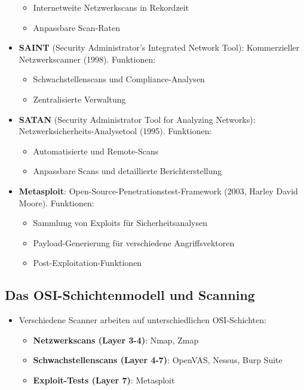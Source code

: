\begin{itemize}
\begin{itemize}
        \item Internetweite Netzwerkscans in Rekordzeit
        \item Anpassbare Scan-Raten
    \end{itemize}
    \item \textbf{SAINT} (Security Administrator's Integrated Network Tool): Kommerzieller Netzwerkscanner (1998). Funktionen:
    \begin{itemize}
        \item Schwachstellenscans und Compliance-Analysen
        \item Zentralisierte Verwaltung
    \end{itemize}
    \item \textbf{SATAN} (Security Administrator Tool for Analyzing Networks): Netzwerksicherheits-Analysetool (1995). Funktionen:
    \begin{itemize}
        \item Automatisierte und Remote-Scans
        \item Anpassbare Scans und detaillierte Berichterstellung
    \end{itemize}
    \item \textbf{Metasploit}: Open-Source-Penetrationstest-Framework (2003, Harley David Moore). Funktionen:
    \begin{itemize}
        \item Sammlung von Exploits für Sicherheitsanalysen
        \item Payload-Generierung für verschiedene Angriffsvektoren
        \item Post-Exploitation-Funktionen
    \end{itemize}
\end{itemize}

\subsection{Das OSI-Schichtenmodell und Scanning}
\begin{itemize}
    \item Verschiedene Scanner arbeiten auf unterschiedlichen OSI-Schichten:
    \begin{itemize}
        \item \textbf{Netzwerkscans (Layer 3-4)}: Nmap, Zmap
        \item \textbf{Schwachstellenscans (Layer 4-7)}: OpenVAS, Nessus, Burp Suite
        \item \textbf{Exploit-Tests (Layer 7)}: Metasploit
    \end{itemize}
\end{itemize}

